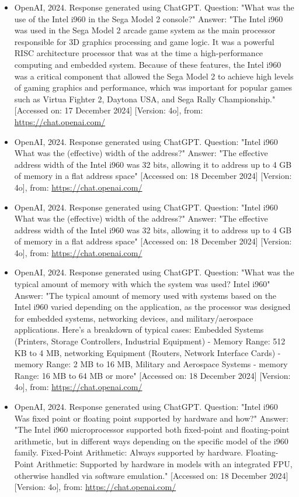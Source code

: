 \documentclass{article}
\begin{document}
\begin{itemize}
\item OpenAI, 2024. Response generated using ChatGPT. Question: "What was the use of the Intel i960 in the Sega Model 2 console?" Answer: "The Intel i960 was used in the Sega Model 2 arcade game system as the main processor responsible for 3D graphics processing and game logic. It was a powerful RISC architecture processor that was at the time a high-performance computing and embedded system. Because of these features, the Intel i960 was a critical component that allowed the Sega Model 2 to achieve high levels of gaming graphics and performance, which was important for popular games such as Virtua Fighter 2, Daytona USA, and Sega Rally Championship." [Accessed on: 17 December 2024] [Version: 4o], from: \url{https://chat.openai.com/}

\item OpenAI, 2024. Response generated using ChatGPT. Question: "Intel i960 What was  the (effective) width of the address?" Answer: "The effective address width of the Intel i960 was 32 bits, allowing it to address up to 4 GB of memory in a flat address space" [Accessed on: 18 December 2024] [Version: 4o], from: \url{https://chat.openai.com/}

\item OpenAI, 2024. Response generated using ChatGPT. Question: "Intel i960 What was  the (effective) width of the address?" Answer: "The effective address width of the Intel i960 was 32 bits, allowing it to address up to 4 GB of memory in a flat address space" [Accessed on: 18 December 2024] [Version: 4o], from: \url{https://chat.openai.com/}

\item OpenAI, 2024. Response generated using ChatGPT. Question: "What was the typical amount of memory with which the system was used? Intel i960" Answer: "The typical amount of memory used with systems based on the Intel i960 varied depending on the application, as the processor was designed for embedded systems, networking devices, and military/aerospace applications. Here’s a breakdown of typical cases: Embedded Systems (Printers, Storage Controllers, Industrial Equipment) - Memory Range: 512 KB to 4 MB, networking Equipment (Routers, Network Interface Cards) - memory Range: 2 MB to 16 MB, Military and Aerospace Systems - memory Range: 16 MB to 64 MB or more" [Accessed on: 18 December 2024] [Version: 4o], from: \url{https://chat.openai.com/}

\item OpenAI, 2024. Response generated using ChatGPT. Question: "Intel i960 Was fixed point or floating point supported by hardware and how?" Answer: "The Intel i960 microprocessor supported both fixed-point and floating-point arithmetic, but in different ways depending on the specific model of the i960 family. Fixed-Point Arithmetic: Always supported by hardware. Floating-Point Arithmetic: Supported by hardware in models with an integrated FPU, otherwise handled via software emulation." [Accessed on: 18 December 2024] [Version: 4o], from: \url{https://chat.openai.com/}


\end{itemize}
\end{document}
